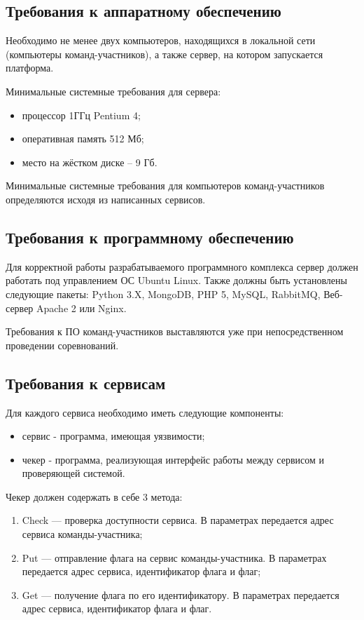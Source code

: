 \subsection {Требования к аппаратному обеспечению}

Необходимо не менее двух компьютеров, находящихся в локальной сети (компьютеры команд-участников), а также сервер, на котором запускается платформа.

Минимальные системные требования для сервера:

\begin{itemize}
\item процессор 1ГГц Pentium 4;
\item оперативная память 512 Мб;
\item место на жёстком диске -- 9 Гб.
\end{itemize}

Минимальные системные требования для компьютеров команд-участников определяются исходя из написанных сервисов.

\subsection {Требования к программному обеспечению}
Для корректной работы разрабатываемого программного комплекса сервер должен работать под управлением ОС Ubuntu Linux. 
Также должны быть установлены следующие пакеты: Python 3.X, MongoDB, PHP 5, MySQL, RabbitMQ, Веб-сервер Apache 2 или Nginx.


Требования к ПО команд-участников выставляются уже при непосредственном проведении соревнований.

\subsection {Требования к сервисам}
Для каждого сервиса необходимо иметь следующие компоненты:

\begin{itemize}
\item сервис - программа, имеющая уязвимости;
\item чекер - программа, реализующая интерфейс работы между сервисом и проверяющей системой.
\end{itemize}

Чекер должен содержать в себе 3 метода:

\begin{enumerate}
\item Check --- проверка доступности сервиса. В параметрах передается адрес сервиса команды-участника;
\item Put --- отправление флага на сервис команды-участника. В параметрах передается адрес сервиса, идентификатор флага и флаг;
\item Get --- получение флага по его идентификатору. В параметрах передается адрес сервиса, идентификатор флага и флаг.
\end{enumerate}

